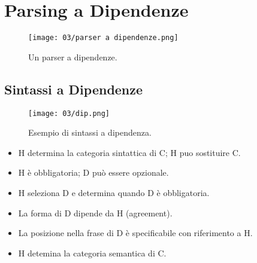 
\section{Parsing a Dipendenze}

\begin{figure}[!h]
    \centering
    \texttt{[image: 03/parser a dipendenze.png]}
    \caption{Un parser a dipendenze.}
\end{figure}

\subsection{Sintassi a Dipendenze}



\begin{figure}[!h]
    \centering
    \texttt{[image: 03/dip.png]}
    \caption{Esempio di sintassi a dipendenza.}
\end{figure}


\begin{itemize}
  \item H determina la categoria sintattica di C; H puo sostituire C. 
  \item H è obbligatoria; D può essere opzionale. 
  \item H seleziona D e determina quando D è obbligatoria. 
  \item La forma di D dipende da H (agreement). 
  \item La posizione nella frase di D è specificabile con
riferimento a H. 
\item H detemina la categoria semantica di C.
\end{itemize}



